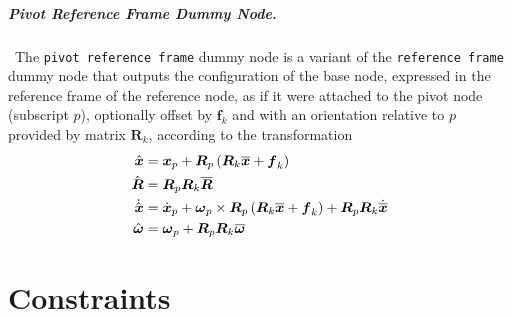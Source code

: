 \documentclass[10pt,dvips,fleqn,subeqn]{report}
\newcommand{\T}[1]{\boldsymbol{#1}}
\begin{document}
\paragraph{Pivot Reference Frame Dummy Node.} \
The \texttt{pivot reference frame} dummy node is a variant
of the \texttt{reference frame} dummy node that outputs
the configuration of the base node, expressed in the reference
frame of the reference node, as if it were attached to the pivot node
(subscript $p$), optionally offset by $\T{f}_k$ and with
an orientation relative to $p$ provided by matrix $\T{R}_k$,
according to the transformation
\begin{align}
	\hat{\T{x}} &= \T{x}_p + \T{R}_p\plbr{\T{R}_k \overline{\T{x}} + \T{f}_k} \\
	\hat{\T{R}} &= \T{R}_p \T{R}_k \overline{\T{R}} \\
	\dot{\hat{\T{x}}} &= \dot{\T{x}}_p
		+ \T{\omega}_p \times\T{R}_p \plbr{
			\T{R}_k \overline{\T{x}} + \T{f}_k
		} + \T{R}_p \T{R}_k \dot{\overline{\T{x}}} \\
	\hat{\T{\omega}} &= \T{\omega}_p + \T{R}_p \T{R}_k \overline{\T{\omega}}
\end{align}




\chapter{Constraints}
\end{document}
